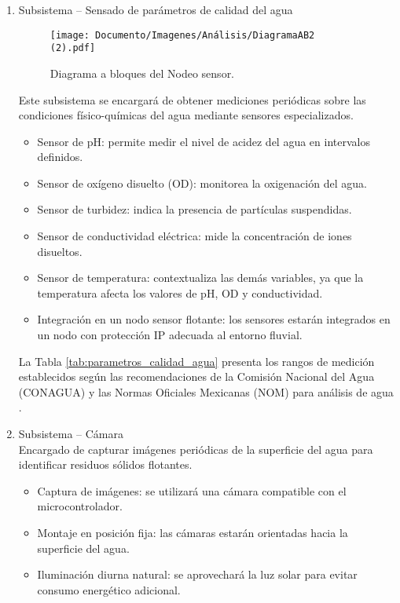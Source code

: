 \begin{enumerate}
    \item Subsistema – Sensado de parámetros de calidad del agua \\
    \begin{figure}[H]
    \centering
    \texttt{[image: Documento/Imagenes/Análisis/DiagramaAB2 (2).pdf]}
    \caption{Diagrama a bloques del Nodeo sensor.}
    \label{Dig:diagramaAB2}
\end{figure}
    Este subsistema se encargará de obtener mediciones periódicas sobre las condiciones físico-químicas del agua mediante sensores especializados.
    \begin{itemize}
        \item Sensor de pH: permite medir el nivel de acidez del agua en intervalos definidos.
        \item Sensor de oxígeno disuelto (OD): monitorea la oxigenación del agua.
        \item Sensor de turbidez: indica la presencia de partículas suspendidas.
        \item Sensor de conductividad eléctrica: mide la concentración de iones disueltos.
        \item Sensor de temperatura: contextualiza las demás variables, ya que la temperatura afecta los valores de pH, OD y conductividad.
        \item Integración en un nodo sensor flotante: los sensores estarán integrados en un nodo con protección IP adecuada al entorno fluvial.
    \end{itemize}
    La Tabla \ref{tab:parametros_calidad_agua} presenta los rangos de medición establecidos según las recomendaciones de la Comisión Nacional del Agua (CONAGUA) \cite{conagua2022} y las Normas Oficiales Mexicanas (NOM) para análisis de agua \cite{nmx0082016, nmx0122001, nmx0382001, nmx0932000}.
    
    

    \item Subsistema – Cámara \\
    Encargado de capturar imágenes periódicas de la superficie del agua para identificar residuos sólidos flotantes.
    \begin{itemize}
        \item Captura de imágenes: se utilizará una cámara compatible con el microcontrolador.
        \item Montaje en posición fija: las cámaras estarán orientadas hacia la superficie del agua.
        \item Iluminación diurna natural: se aprovechará la luz solar para evitar consumo energético adicional.
    \end{itemize}


\end{enumerate}
